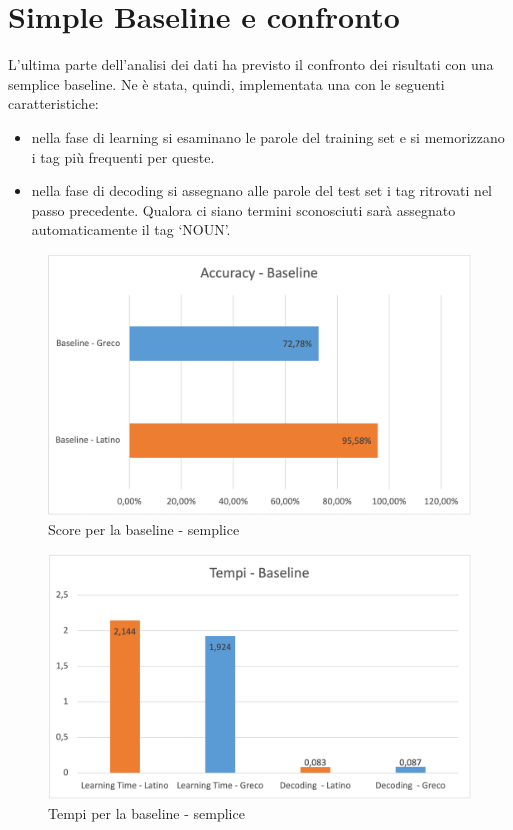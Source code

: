 \documentclass[12pt]{article}
\begin{document}
\section{Simple Baseline e confronto}
L’ultima parte dell’analisi dei dati ha previsto il confronto dei risultati con una semplice baseline. Ne è stata, quindi, implementata una con le seguenti caratteristiche:

\begin{itemize}
    \item nella fase di learning si esaminano le  parole del training set e si memorizzano i tag più frequenti per queste.
    \item nella fase di decoding si assegnano alle parole del test set i tag ritrovati nel passo precedente. Qualora ci siano termini sconosciuti sarà assegnato automaticamente il tag ‘NOUN’.
\end{itemize}

\begin{figure}[H]
   \centering
   \includegraphics[scale=0.5]{fig/AccuracyBaseline.png}
   \caption{Score per la baseline - semplice}\label{fig:scoreBaselie}
\end{figure}

\begin{figure}[H]
   \centering
   \includegraphics[scale=0.5]{fig/TempiBaseline.png}
   \caption{Tempi per la baseline - semplice}\label{fig:tempiBaselie}
\end{figure}
\end{document}
